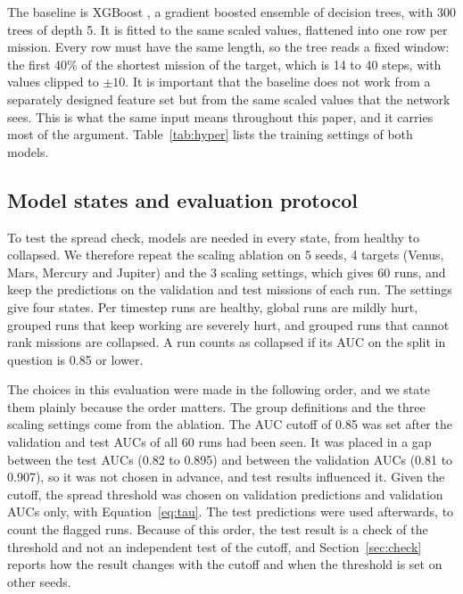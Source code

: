 The baseline is XGBoost \cite{chen2016}, a gradient boosted ensemble of decision trees, with 300 trees of depth 5. It is fitted to the same scaled values, flattened into one row per mission. Every row must have the same length, so the tree reads a fixed window: the first 40\% of the shortest mission of the target, which is 14 to 40 steps, with values clipped to $\pm 10$. It is important that the baseline does not work from a separately designed feature set but from the same scaled values that the network sees. This is what the same input means throughout this paper, and it carries most of the argument. Table~\ref{tab:hyper} lists the training settings of both models.


\subsection{Model states and evaluation protocol}
\label{sec:protocol}

To test the spread check, models are needed in every state, from healthy to collapsed. We therefore repeat the scaling ablation on 5 seeds, 4 targets (Venus, Mars, Mercury and Jupiter) and the 3 scaling settings, which gives 60 runs, and keep the predictions on the validation and test missions of each run. The settings give four states. Per timestep runs are healthy, global runs are mildly hurt, grouped runs that keep working are severely hurt, and grouped runs that cannot rank missions are collapsed. A run counts as collapsed if its AUC on the split in question is 0.85 or lower.

The choices in this evaluation were made in the following order, and we state them plainly because the order matters. The group definitions and the three scaling settings come from the ablation. The AUC cutoff of 0.85 was set after the validation and test AUCs of all 60 runs had been seen. It was placed in a gap between the test AUCs (0.82 to 0.895) and between the validation AUCs (0.81 to 0.907), so it was not chosen in advance, and test results influenced it. Given the cutoff, the spread threshold was chosen on validation predictions and validation AUCs only, with Equation~\ref{eq:tau}. The test predictions were used afterwards, to count the flagged runs. Because of this order, the test result is a check of the threshold and not an independent test of the cutoff, and Section~\ref{sec:check} reports how the result changes with the cutoff and when the threshold is set on other seeds.

